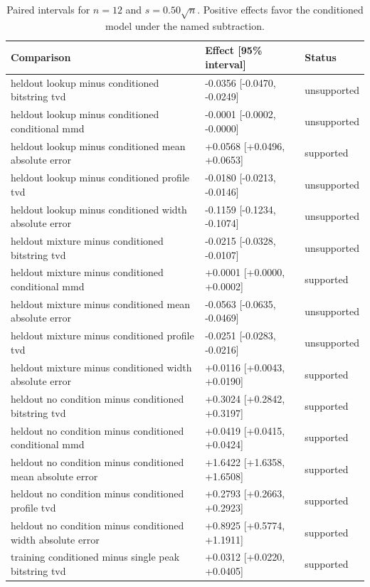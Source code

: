 \begin{table}[p]
\centering
\scriptsize
\setlength{\tabcolsep}{4pt}
\caption{Paired intervals for $n=12$ and $s=0.50\sqrt n$. Positive effects favor the conditioned model under the named subtraction.}
\label{tab:all-intervals-n12-w0.50}
\begin{tabular}{@{}p{}p{}p{}@{}}
\toprule
Comparison & Effect [95\% interval] & Status\\
\midrule
heldout lookup minus conditioned bitstring tvd & -0.0356 [-0.0470, -0.0249] & unsupported \\
heldout lookup minus conditioned conditional mmd & -0.0001 [-0.0002, -0.0000] & unsupported \\
heldout lookup minus conditioned mean absolute error & +0.0568 [+0.0496, +0.0653] & supported \\
heldout lookup minus conditioned profile tvd & -0.0180 [-0.0213, -0.0146] & unsupported \\
heldout lookup minus conditioned width absolute error & -0.1159 [-0.1234, -0.1074] & unsupported \\
heldout mixture minus conditioned bitstring tvd & -0.0215 [-0.0328, -0.0107] & unsupported \\
heldout mixture minus conditioned conditional mmd & +0.0001 [+0.0000, +0.0002] & supported \\
heldout mixture minus conditioned mean absolute error & -0.0563 [-0.0635, -0.0469] & unsupported \\
heldout mixture minus conditioned profile tvd & -0.0251 [-0.0283, -0.0216] & unsupported \\
heldout mixture minus conditioned width absolute error & +0.0116 [+0.0043, +0.0190] & supported \\
heldout no condition minus conditioned bitstring tvd & +0.3024 [+0.2842, +0.3197] & supported \\
heldout no condition minus conditioned conditional mmd & +0.0419 [+0.0415, +0.0424] & supported \\
heldout no condition minus conditioned mean absolute error & +1.6422 [+1.6358, +1.6508] & supported \\
heldout no condition minus conditioned profile tvd & +0.2793 [+0.2663, +0.2923] & supported \\
heldout no condition minus conditioned width absolute error & +0.8925 [+0.5774, +1.1911] & supported \\
training conditioned minus single peak bitstring tvd & +0.0312 [+0.0220, +0.0405] & supported \\

\end{tabular}
\end{table}
